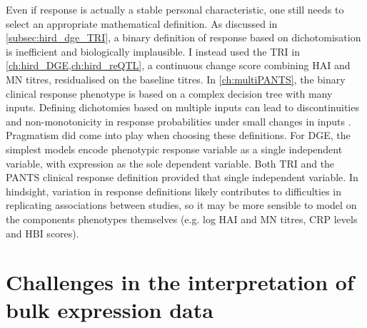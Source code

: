 Even if response is actually a stable personal characteristic, one still needs to select an appropriate mathematical definition.
As discussed in \cref{subsec:hird_dge_TRI}, a binary definition of response based on dichotomisation is inefficient and biologically implausible.
I instead used the \gls{TRI} in \cref{ch:hird_DGE,ch:hird_reQTL}, a continuous change score combining \gls{HAI} and \gls{MN} titres, residualised on the baseline titres.
In \cref{ch:multiPANTS}, the binary clinical response phenotype is based on a complex decision tree with many inputs.
Defining dichotomies based on multiple inputs can lead to discontinuities and non-monotonicity in response probabilities under small changes in inputs \autocite{senn2005DichotomaniaObsessiveCompulsive}.
Pragmatism did come into play when choosing these definitions.
For \gls{DGE}, the simplest models encode phenotypic response variable as a single independent variable, with expression as the sole dependent variable.
Both \gls{TRI} and the \gls{PANTS} clinical response definition provided that single independent variable.
In hindsight, variation in response definitions likely contributes to difficulties in replicating associations between studies,
so it may be more sensible to model on the components phenotypes themselves (e.g. log \gls{HAI} and \gls{MN} titres, \gls{CRP} levels and \gls{HBI} scores).


\section{Challenges in the interpretation of bulk expression data}
\label{sec:discussion_bulkData}

